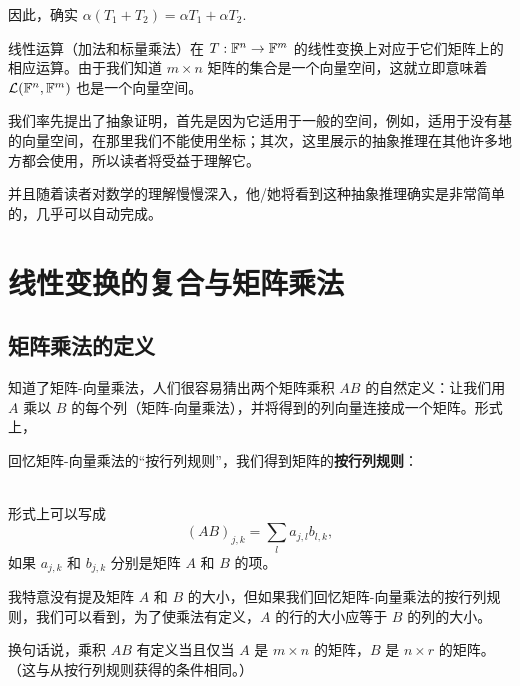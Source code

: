 因此，确实 $\alpha (T_1 + T_2) = \alpha T_1 + \alpha T_2$.

\begin{remark*}
线性运算（加法和标量乘法）在 $T: \mathbb{F}^n \to \mathbb{F}^m$ 的线性变换上对应于它们矩阵上的相应运算。由于我们知道 $m \times n$ 矩阵的集合是一个向量空间，这就立即意味着 $\mathcal{L}(\mathbb{F}^n, \mathbb{F}^m)$ 也是一个向量空间。
\end{remark*}

我们率先提出了抽象证明，首先是因为它适用于一般的空间，例如，适用于没有基的向量空间，在那里我们不能使用坐标；其次，这里展示的抽象推理在其他许多地方都会使用，所以读者将受益于理解它。

并且随着读者对数学的理解慢慢深入，他/她将看到这种抽象推理确实是非常简单的，几乎可以自动完成。

\section{线性变换的复合与矩阵乘法}\label{sec:01-05}

\subsection{矩阵乘法的定义}\label{sec:01-05-01}

知道了矩阵-向量乘法，人们很容易猜出两个矩阵乘积 $AB$ 的自然定义：让我们用 $A$ 乘以 $B$ 的每个列（矩阵-向量乘法），并将得到的列向量连接成一个矩阵。形式上，


回忆矩阵-向量乘法的“按行列规则”，我们得到矩阵的\textbf{按行列规则}：

\\
形式上可以写成
$$(AB)_{j,k} = \sum_{l} a_{j,l} b_{l,k},$$
如果 $a_{j,k}$ 和 $b_{j,k}$ 分别是矩阵 $A$ 和 $B$ 的项。

我特意没有提及矩阵 $A$ 和 $B$ 的大小，但如果我们回忆矩阵-向量乘法的按行列规则，我们可以看到，为了使乘法有定义，$A$ 的行的大小应等于 $B$ 的列的大小。

换句话说，乘积 $AB$ 有定义当且仅当 $A$ 是 $m \times n$ 的矩阵，$B$ 是 $n \times r$ 的矩阵。（这与从按行列规则获得的条件相同。）

